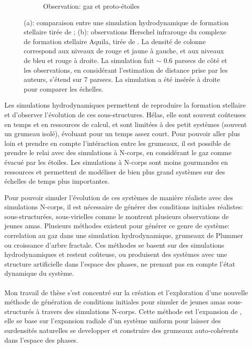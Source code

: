 \begin{figure}
\begin{subfigure}[b]{0.48\textwidth}
        \caption{Observation: gaz et proto-\'etoiles}
        \label{Fig:resume_aquila_bate2012}
    \end{subfigure}
\caption{(a): comparaison entre une simulation hydrodynamique de formation stellaire tir\'ee de \cite{Bate2012}; (b): observations Herschel infrarouge du complexe de formation stellaire Aquila, tir\'ee de \cite{Konyves2010}. La densit\'e de colonne correspond aux niveaux de rouge et jaune \`a gauche, et aux niveaux de bleu et rouge \`a droite. La simulation fait $\sim$ 0.6 parsecs de c\^ot\'e et les observations, en consid\'erant l'estimation de distance prise par les auteurs, s'\'etend sur 7 parsecs. La simulation a \'et\'e ins\'er\'ee \`a droite pour comparer les \'echelles.}
\label{Fig:resume_clumps}
\end{figure}

Les simulations hydrodynamiques permettent de reproduire la formation stellaire et d'observer l'\'evolution de ces sous-structures. H\'elas, elle sont souvent co\^uteuses en temps et en ressources de calcul, et sont limit\'ees \`a des petit syst\`emes (souvent un grumeau isol\'e), \'evoluant pour un temps assez court. Pour pouvoir aller plus loin et prendre en compte l’int\'eraction entre les grumeaux, il est possible de prendre le relai avec des simulations \`a N-corps, en consid\'erant le gaz comme \'evacu\'e par les \'etoiles. Les simulations \`a N-corps sont moins gourmandes en ressources et permettent de mod\'eliser de bien plus grand syst\`emes sur des \'echelles de temps plus importantes.

Pour pouvoir simuler l'\'evolution de ces syst\`emes de mani\`ere r\'ealiste avec des simulations N-corps, il est n\'ecessaire de g\'en\'erer des conditions initiales r\'ealistes: sous-structur\'ees, sous-virielles comme le montrent plusieurs observations de jeunes amas. Plusieurs m\'ethodes existent pour g\'en\'erer ce genre de syst\`eme: correlation au gaz dans une simulation hydrodynamique, grumeaux de Plummer ou croissance d'arbre fractale. Ces m\'ethodes se basent sur des simulations hydrodynamiques et restent co\^uteuse, ou produisent des syst\`emes avec une structure  artificielle dans l'espace des phases, ne prenant pas en compte l'\'etat dynamique du syst\`eme.

\paragraph*{}
Mon travail de th\`ese s'est concentr\'e sur la cr\'eation et l'exploration d'une nouvelle m\'ethode de g\'en\'eration de conditions initiales pour simuler de jeunes amas sous-structur\'es \`a travers des simulations N-corps. Cette m\'ethode est l'expansion de \HubLem, elle se base sur l'expansion radiale d'un syst\`eme uniform pour laisser des surdensit\'es naturelles se developper et construire des grumeaux auto-coh\'erents dans l'espace des phases.

